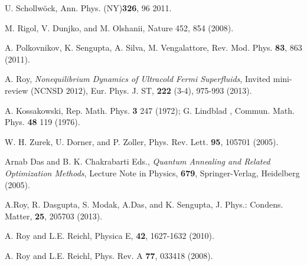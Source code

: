 \documentclass[a4paper,11pt,color]{article}
\renewenvironment{thebibliography}[1]{%
    \begin{oldthebibliography}{#1}%
      \setlength{\parskip}{0ex}%
      \setlength{\itemsep}{0ex}%
  }%
  {%
    \end{oldthebibliography}%
  }
\begin{document}
\begin{thebibliography}{}
%
 {U.} {Schollw{\"o}ck},  {Ann. Phys. (NY)}\textbf {{326}}, {96}  {2011}.
  
M. Rigol, V. Dunjko, and M. Olshanii, Nature 452, 854 (2008).

A. Polkovnikov, K. Sengupta, A. Silva, M. Vengalattore, Rev. Mod. Phys. \textbf{83}, 863 (2011).

A. Roy, \textit{Nonequilibrium Dynamics of Ultracold Fermi Superfluids}, Invited mini-review (NCNSD $2012$),
Eur. Phys. J. ST, {\bf 222} (3-4), 975-993 (2013).

A. Kossakowski, Rep. Math. Phys. {\bf 3} 247 (1972); G. Lindblad , Commun. Math. Phys. {\bf 48} 119 (1976).

W. H. Zurek, U. Dorner, and P. Zoller, Phys. Rev. Lett. {\bf 95}, 105701 (2005).

Arnab Das and B. K. Chakrabarti Eds., \textit{Quantum Annealing and Related Optimization Methods}, Lecture Note in Physics, {\bf 679}, Springer-Verlag, Heidelberg (2005).

A.Roy, R. Dasgupta, S. Modak, A.Das, and K. Sengupta,  J. Phys.: Condens. Matter, {\bf 25}, 205703 (2013).

A. Roy and L.E. Reichl,  Physica {E}, {\bf 42}, 1627-1632 (2010). 

A. Roy and L.E. Reichl,  Phys. Rev. {A} {\bf 77}, 033418 (2008).

\end{thebibliography}
\end{document}
